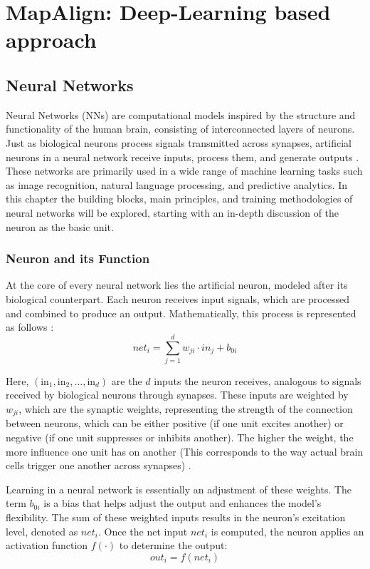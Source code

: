 \NoBgThispage
\chapter{MapAlign: Deep-Learning based approach}

\section{Neural Networks}
Neural Networks (NNs) are computational models inspired by the structure and functionality of the human brain, consisting of interconnected layers of neurons. Just as biological neurons process signals transmitted across synapses, artificial neurons in a neural network receive inputs, process them, and generate outputs \cite{Grosan2011}. These networks are primarily used in a wide range of machine learning tasks such as image recognition, natural language processing, and predictive analytics.
In this chapter the building blocks, main principles, and training methodologies of neural networks will be explored, starting with an in-depth discussion of the neuron as the basic unit.

\subsection{Neuron and its Function}
At the core of every neural network lies the artificial neuron, modeled after its biological counterpart. Each neuron receives input signals, which are processed and combined to produce an output. Mathematically, this process is represented as follows \cite{10.11648/j.ajnna.20190501.12}:
\begin{equation}
    \textit{net}_i = \sum_{j=1}^{d} w_{ji} \cdot \textit{in}_j + b_{0i}
\end{equation}

Here, $(\text{in}_1, \text{in}_2, \ldots, \text{in}_d)$ are the $d$ inputs the neuron receives, analogous to signals received by biological neurons through synapses. These inputs are weighted by $w_{ji}$, which are the synaptic weights, representing the strength of the connection between neurons, which can be either positive (if one unit excites another) or negative (if one unit suppresses or inhibits another). The higher the weight, the more influence one unit has on another (This corresponds to the way actual brain cells trigger one another across synapses) \cite{10.11648/j.ajnna.20190501.12}.

Learning in a neural network is essentially an adjustment of these weights. The term $b_{0i}$ is a bias that helps adjust the output and enhances the model's flexibility. The sum of these weighted inputs results in the neuron’s excitation level, denoted as $\textit{net}_i$.
Once the net input ${net}_i$ is computed, the neuron applies an activation function $f(\cdot)$ to determine the output:
\begin{equation}
    \textit{out}_i = f(\textit{net}_i)
\end{equation}

